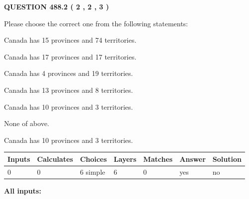 \documentclass[12pt]{article}
\begin{document}
   
  
\vspace{0.2in}
  
{\textbf{\Large{QUESTION
488.2 
 ( 2 , 2 , 3 )
}}}
  
  
Please choose the correct one from the following statements:
 
 
Canada has  15 provinces and  74 territories.
 
 
Canada has  17 provinces and  17 territories.
 
 
Canada has   4 provinces and  19 territories.
 
 
Canada has  13 provinces and  8 territories.
 
 
Canada has 10  provinces and 3 territories.
 
 
 None of above.
 
 
\noindent{}
 
 
Canada has 10  provinces and 3 territories.
 
 
\noindent{}
 
 
   
   
   
   
\noindent\begin{tabular}{|l|l|l|l|l|l|l|}
 \hline
Inputs & Calculates & Choices & Layers & Matches & Answer & Solution \\ \hline
 0  & 
 0  & 
 6
  simple  
  & 
 6  & 
 0  & 
  yes & 
  no 
  \\ \hline
 \end{tabular}
   
   
   
   
\noindent{}
   
   
   
   
\noindent\vspace{0.1in}\hspace{-0.08in} {\textbf{\Large{All inputs: }}}
   
   
   
   
   
   
 \vspace{0.2in}
 
\end{document}
